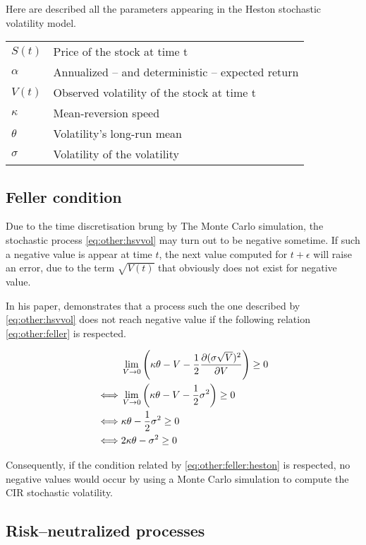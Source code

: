 \documentclass[12pt]{report}
\begin{document}
Here are described all the parameters appearing in the Heston stochastic volatility model.

\begin{tabular}{ll}
  $S(t)$ & Price of the stock at time t \\
  $\alpha$ &  Annualized -- and deterministic -- expected return \\
  $V(t)$ & Observed volatility of the stock at time t \\
  $\kappa$ & Mean-reversion speed \\
  $\theta$ & Volatility's long-run mean \\
  $\sigma$ & Volatility of the volatility 
\end{tabular}

\subsection{Feller condition}
\label{sub:other:heston:feller}

Due to the time discretisation brung by The Monte Carlo simulation, the stochastic process \ref{eq:other:hsvvol} may turn out to be negative sometime. If such a negative value is appear at time $t$, the next value computed for $t+\epsilon$ will raise an error, due to the term $\sqrt{V(t)}$ that obviously does not exist for negative value.

In his paper, \citet{feller1951} demonstrates that a process such the one described by \cref{eq:other:hsvvol} does not reach negative value if the following relation \ref{eq:other:feller} is respected.

\begin{align}
  &\lim_{V\to 0} \left( \kappa \theta - V - \frac{1}{2} \frac{\partial(\sigma \sqrt{V})^2}{\partial V} \right) \geq 0 \label{eq:other:feller} \\
  \iff &\lim_{V\to 0} \left( \kappa \theta - V - \frac{1}{2} \sigma^2 \right) \geq 0 \notag \\
  \iff &\kappa \theta  - \frac{1}{2} \sigma^2  \geq 0 \notag \\
  \iff & 2 \kappa \theta  - \sigma^2  \geq 0 \label{eq:other:feller:heston}
\end{align}

Consequently, if the condition related by \cref{eq:other:feller:heston} is respected, no negative values would occur by using a Monte Carlo simulation to compute the CIR stochastic volatility.

\subsection{Risk--neutralized processes}
\label{sub:other:heston:risk}
\end{document}
